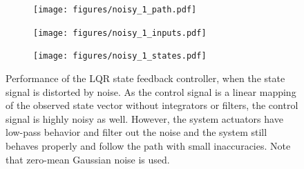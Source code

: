 \begin{figure}[h]
	\centering
	\begin{minipage}{0.4\textwidth}
		\begin{subfigure}{\textwidth}
				\texttt{[image: figures/noisy\_1\_path.pdf]}
		\end{subfigure}
		\begin{subfigure}{\textwidth}
				\texttt{[image: figures/noisy\_1\_inputs.pdf]}
		\end{subfigure}
	\end{minipage}
	\begin{subfigure}{.59\textwidth}
		\texttt{[image: figures/noisy\_1\_states.pdf]}
	\end{subfigure}
	\caption{Performance of the LQR state feedback controller, when the state signal is distorted by noise. As the control signal is a linear mapping of the observed state vector without integrators or filters, the control signal is highly noisy as well. However, the system actuators have low-pass behavior and filter out the noise and the system still behaves properly and follow the path with small inaccuracies. Note that zero-mean Gaussian noise is used.}
	\label{fig:noisy_states}
\end{figure}

